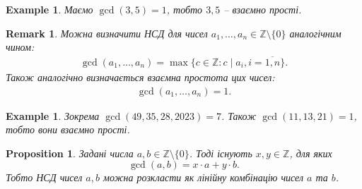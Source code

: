 \documentclass[a4paper, 10pt]{article}
\theoremstyle{theoremdd}
\theoremstyle{theoremdd}
\theoremstyle{theoremdd}
\theoremstyle{theoremdd}
\newtheorem{example}[theorem]{Example}
\theoremstyle{theoremdd}
\newtheorem{proposition}[theorem]{Proposition}
\theoremstyle{theoremdd}
\newtheorem{remark}[theorem]{Remark}
\theoremstyle{theoremdd}
\theoremstyle{theoremdd}
\begin{document}
\begin{example}
Маємо $\gcd(3,5) = 1$, тобто $3,5$ -- взаємно прості.
\end{example}

\begin{remark}
Можна визначити НСД для чисел $a_1,\dots,a_n \in \mathbb{Z} \setminus \{0\}$ аналогічним чином:
\begin{align*}
\gcd(a_1,\dots,a_n) = \max\{c \in \mathbb{Z}: c \mid a_i, i = \overline{1,n}\}.
\end{align*}
Також аналогічно визначається взаємна простота цих чисел:
\begin{align*}
\gcd(a_1,\dots,a_n) = 1.
\end{align*}
\end{remark}

\begin{example}
Зокрема $\gcd(49,35,28,2023) = 7$. Також $\gcd(11,13,21) = 1$, тобто вони взаємно прості.
\end{example}

\begin{proposition}
\label{gcd(a,b) = xa+yb}
Задані числа $a,b \in \mathbb{Z} \setminus \{0\}$. Тоді існують $x,y \in \mathbb{Z}$, для яких
\begin{equation}
\label{eq:gcd(a,b)_as_linear_combination}
\gcd(a,b) = x \cdot a + y \cdot b.
\end{equation}
Тобто НСД чисел $a,b$ можна розкласти як лінійну комбінацію чисел $a$ та $b$.
\end{proposition}
\end{document}
